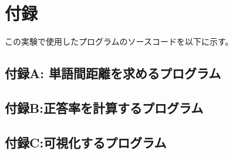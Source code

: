 \documentclass[a4paper,12pt]{article}
\begin{document}
\newpage

\appendix
\section{付録}
この実験で使用したプログラムのソースコードを以下に示す。

\subsection{付録A: 単語間距離を求めるプログラム}


\subsection{付録B:正答率を計算するプログラム}


\subsection{付録C:可視化するプログラム}

\end{document}
